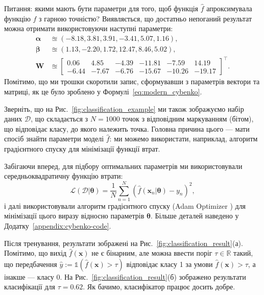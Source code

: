 \begin{example}
	Питання: якими мають бути параметри для того, щоб функція $\widehat{f}$
	апроксимувала функцію $f$ з гарною точністю? Виявляється, що достатньо
	непоганий результат можна отримати використовуючи наступні параметри:
	\begin{align*}
		\boldsymbol{\alpha} &\approxeq (-8.18, 3.81, 3.91, -3.41, 5.07, 1.16), \\
		\boldsymbol{\beta} &\approxeq (1.13, -2.20, 1.72, 12.47, 8.46, 5.02), \\
		\boldsymbol{W} &\approxeq \begin{bmatrix}
			0.06 & 4.85 & -4.39 & -11.81 & -7.59 & 14.19 \\
			-6.44 & -7.67 & -6.76 & -15.67 & -10.26 & -19.17
		\end{bmatrix}^{\top}.
	\end{align*}
	Помітимо, що ми трошки скоротили запис, сформувавши з параметрів вектори та
	матриці, як це було зроблено у Формулі~\ref{eq:modern_cybenko}.
\end{example}

Зверніть, що на Рис.~\ref{fig:classification_example} ми також зображуємо набір
даних $\mathcal{D}$, що складається з $N=1000$ точок з відповідним маркуванням
(бітом), що відповідає класу, до якого належить точка. Головна причина цього ---
мати спосіб знайти параметри моделі $\widehat{f}$: ми можемо використати, наприклад,
алгоритм градієнтного спуску для мінімізації функції втрат. 

\begin{remark}
	Забігаючи вперед, для підбору оптимальних параметрів ми використовували
	середньоквадратичну функцію втрати:
	\begin{equation*}
		\mathcal{L}(\mathcal{D}|\boldsymbol{\theta}) = \frac{1}{N}\sum_{n=1}^N \left(\widehat{f}(\mathbf{x}_n|\boldsymbol{\theta}) - y_n\right)^2,
	\end{equation*}
	і далі використовували алгоритм градієнтного спуску (Adam Optimizer \cite{adam}) для мінімізації цього виразу відносно параметрів $\boldsymbol{\theta}$. Більше деталей наведено у Додатку~\ref{appendix:cybenko-code}.
\end{remark}

Після тренування, результати зображені на
Рис.~\ref{fig:classification_result}(а). Помітимо, що вихід
$\widehat{f}(\mathbf{x})$ не є бінарним, але можна ввести поріг $\tau \in
\mathbb{R}$ такий, що передбачення $\widehat{y} := \mathds{1}(\widehat{f}(\mathbf{x}) >
\tau)$ відповідає класу 1 за умови $\widehat{f}(\mathbf{x}) > \tau$, а інакше ---
класу 0. На Рис.~\ref{fig:classification_result}(б) зображено результати
класифікації для $\tau=0.62$. Як бачимо, класифікатор працює досить добре.

